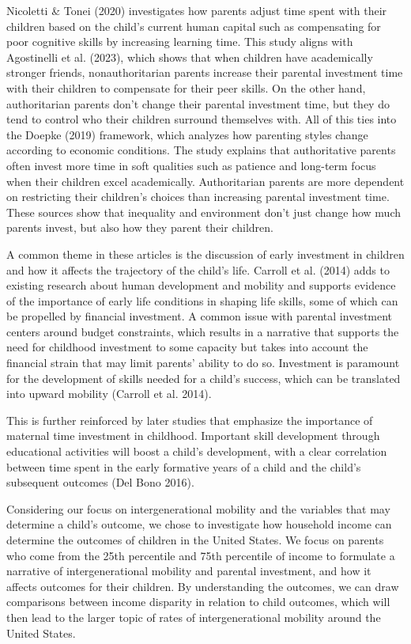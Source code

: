 \documentclass[12pt]{article}
\begin{document}
Nicoletti \& Tonei (2020) investigates how parents adjust time spent with their children based on the child’s current human capital such as compensating for poor cognitive skills by increasing learning time. This study aligns with Agostinelli et al. (2023), which shows that when children have academically stronger friends, nonauthoritarian parents increase their parental investment time with their children to compensate for their peer skills. On the other hand, authoritarian parents don’t change their parental investment time, but they do tend to control who their children surround themselves with. All of this ties into the Doepke (2019) framework, which analyzes how parenting styles change according to economic conditions. The study explains that authoritative parents often invest more time in soft qualities such as patience and long-term focus when their children excel academically. Authoritarian parents are more dependent on restricting their children’s choices than increasing parental investment time. These sources show that inequality and environment don't just change how much parents invest, but also how they parent their children.

A common theme in these articles is the discussion of early investment in children and how it affects the trajectory of the child’s life. Carroll et al. (2014) adds to existing research about human development and mobility and supports evidence of the importance of early life conditions in shaping life skills, some of which can be propelled by financial investment. A common issue with parental investment centers around budget constraints, which results in a narrative that supports the need for childhood investment to some capacity but takes into account the financial strain that may limit parents' ability to do so. Investment is paramount for the development of skills needed for a child’s success, which can be translated into upward mobility (Carroll et al. 2014).

This is further reinforced by later studies that emphasize the importance of maternal time investment in childhood. Important skill development through educational activities will boost a child's development, with a clear correlation between time spent in the early formative years of a child and the child's subsequent outcomes (Del Bono 2016).

Considering our focus on intergenerational mobility and the variables that may determine a child's outcome, we chose to investigate how household income can determine the outcomes of children in the United States. We focus on parents who come from the 25th percentile and 75th percentile of income to formulate a narrative of intergenerational mobility and parental investment, and how it affects outcomes for their children. By understanding the outcomes, we can draw comparisons between income disparity in relation to child outcomes, which will then lead to the larger topic of rates of intergenerational mobility around the United States. 
\end{document}

